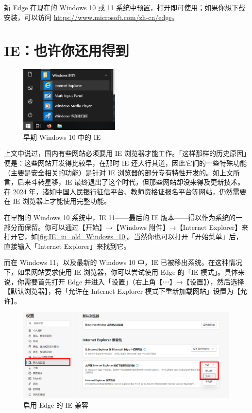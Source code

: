 新 Edge 在现在的 Windows 10 或 11 系统中预置，打开即可使用；如果你想下载安装，可以访问 \url{https://www.microsoft.com/zh-cn/edge}。

\section{IE：也许你还用得到}

\begin{figure}
  \centering
  \includegraphics[width=5cm]{assets/software/IE_in_old_Windows_10.png}
  \caption{早期 Windows 10 中的 IE}
  \label{fig:IE_in_old_Windows_10}
\end{figure}

上文中说过，国内有些网站必须要用 IE 浏览器才能工作。「这样那样的历史原因」便是：这些网站开发得比较早，在那时 IE 还大行其道，因此它们的一些特殊功能（主要是安全相关的功能）是针对 IE 浏览器的部分专有特性开发的。如上文所言，后来斗转星移，IE 最终退出了这个时代，但那些网站却没来得及更新技术。在 2024 年，诸如中国人民银行征信平台、教师资格证报名平台等网站，仍然需要在 IE 浏览器上才能使用完整功能。

在早期的 Windows 10 系统中，IE 11——最后的 IE 版本——得以作为系统的一部分而保留。你可以通过【开始】→【Windows 附件】→【Internet Explorer】来打开它，如\autoref{fig:IE_in_old_Windows_10}。当然你也可以打开「开始菜单」后，直接输入「Internet Explorer」来找到它。

而在 Windows 11，以及最新的 Windows 10 中，IE 已被移出系统。在这种情况下，如果网站要求使用 IE 浏览器，你可以尝试使用 Edge 的「IE 模式」。具体来说，你需要首先打开 Edge 并进入「设置」（右上角【⋯】→【设置】），然后选择【默认浏览器】，将「允许在 Internet Explorer 模式下重新加载网站」设置为【允许】。

\begin{figure}[htb!]
  \centering
  \includegraphics[width=.75\textwidth]{assets/software/Edge_IE_Mode_1.png}
  \caption{启用 Edge 的 IE 兼容}
  \label{fig:Edge_IE_Mode_1}
\end{figure}

